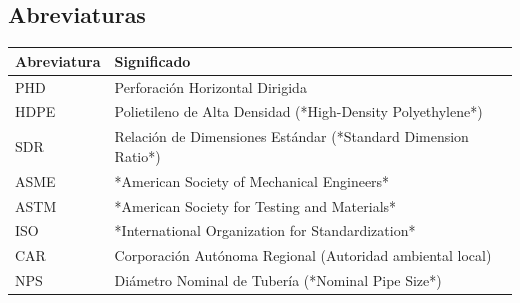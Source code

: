 \vspace{1cm}

\subsection*{Abreviaturas}

\begin{tabularx}{\textwidth}{@{}l>{\raggedright\arraybackslash}X@{}}
	\toprule
	\textbf{Abreviatura} & \textbf{Significado} \\
	\midrule
	PHD & Perforación Horizontal Dirigida \\
	HDPE & Polietileno de Alta Densidad (*High-Density Polyethylene*) \\
	SDR & Relación de Dimensiones Estándar (*Standard Dimension Ratio*) \\
	ASME & *American Society of Mechanical Engineers* \\
	ASTM & *American Society for Testing and Materials* \\
	ISO & *International Organization for Standardization* \\
	CAR & Corporación Autónoma Regional (Autoridad ambiental local) \\
	NPS & Diámetro Nominal de Tubería (*Nominal Pipe Size*) \\
	\bottomrule
\end{tabularx}

\newpage
